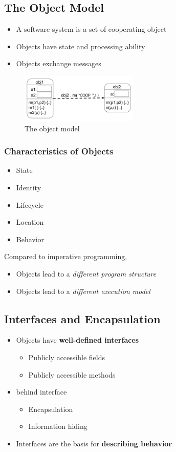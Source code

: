 \subsection{The Object Model}
\begin{itemize}
 \item A software system is a set of cooperating object
 \item Objects have state and processing ability
 \item Objects exchange messages
\end{itemize}
\begin{figure}[H]
  \centering
    \includegraphics[width=0.5\textwidth]{img/01_object_model}
      \caption{The object model}
\end{figure}
\subsubsection{Characteristics of Objects}
\begin{itemize}
 \item State
 \item Identity
 \item Lifecycle
 \item Location
 \item Behavior
\end{itemize}
Compared to imperative programming, 
\begin{itemize}
 \item Objects lead to a \emph{different program structure}
 \item Objects lead to a \emph{different execution model}
\end{itemize}

\subsection{Interfaces and Encapsulation} 
\begin{itemize}
 \item Objects have \textbf{well-defined interfaces}
  \begin{itemize}
   \item Publicly accessible fields
   \item Publicly accessible methods
  \end{itemize}
 \item {} behind interface
  \begin{itemize}
   \item Encapsulation
   \item Information hiding
  \end{itemize}
 \item Interfaces are the basis for \textbf{describing behavior}
\end{itemize}

